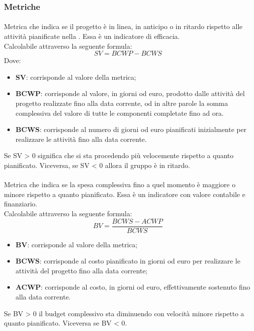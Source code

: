 \subsubsection{Metriche}
\paragraph{} \Spazio
Metrica che indica se il progetto è in linea, in anticipo o in ritardo rispetto alle attività pianificate nella . Essa è un indicatore di efficacia. \\
Calcolabile attraverso la seguente formula:
\[ SV=BCWP-BCWS\]
Dove:
\begin{itemize}
	\item {\textbf{SV}: corrisponde al valore della metrica;}
	\item {\textbf{BCWP}: corrisponde al valore, in giorni od euro, prodotto dalle attività del progetto realizzate fino alla data corrente, od in altre parole la somma complessiva del valore di tutte le componenti completate fino ad ora.}
	\item {\textbf{BCWS}: corrisponde al numero di giorni od euro pianificati inizialmente per realizzare le attività fino alla data corrente.}
\end{itemize}
Se SV > 0 significa che si sta procedendo più velocemente rispetto a quanto pianificato. Viceversa, se SV < 0 allora il gruppo è in ritardo.
\paragraph{} \Spazio
Metrica che indica se la spesa complessiva fino a quel momento è maggiore o minore rispetto a quanto pianificato. Essa è un indicatore con valore contabile e finanziario. \\
Calcolabile attraverso la seguente formula:
\[BV=\frac{BCWS-ACWP}{BCWS}\]
\begin{itemize}
	\item {\textbf{BV}: corrisponde al valore della metrica;}
	\item {\textbf{BCWS}: corrisponde al costo pianificato in giorni od euro per realizzare le attività del progetto fino alla data corrente;}
	\item {\textbf{ACWP}: corrisponde al costo, in giorni od euro, effettivamente sostenuto fino alla data corrente.}
\end{itemize}
Se BV > 0 il budget complessivo sta diminuendo con velocità minore rispetto a quanto pianificato. Viceversa se BV < 0.
